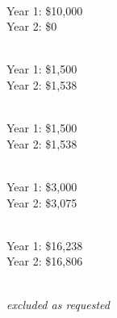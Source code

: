 \documentclass[12pt, preprint]{hacked-aastex}
\begin{document}
\\
Year 1: \$10,000\\
Year 2: \$0

\\
Year 1: \$1,500\\
Year 2: \$1,538

\\
Year 1: \$1,500\\
Year 2: \$1,538

\\
Year 1: \$3,000\\
Year 2: \$3,075

\\
Year 1: \$16,238\\
Year 2: \$16,806

\\
{\it excluded as requested}
\end{document}
